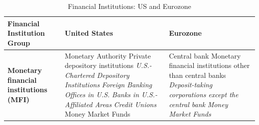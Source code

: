 \begin{table}[ht!]
\centering
\caption{Financial Institutions: US and Eurozone}
\label{tab:fi_mapping}
\small
\begin{tabular}{@{} >{\raggedright\arraybackslash}p{3.5cm} >{\raggedright\arraybackslash}p{6cm} >{\raggedright\arraybackslash}p{5.5cm} @{}}
\toprule
\textbf{Financial Institution Group} & \textbf{United States} & \textbf{Eurozone} \\
\midrule
\textbf{Monetary financial institutions (MFI)} & 
Monetary Authority \newline 
Private depository institutions \newline
\hspace*{1em} \textit{U.S.-Chartered Depository} \newline 
\hspace*{1em} \textit{Institutions} \newline 
\hspace*{1em} \textit{Foreign Banking Offices in U.S.} \newline 
\hspace*{1em} \textit{Banks in U.S.-Affiliated Areas} \newline 
\hspace*{1em} \textit{Credit Unions} \newline 
Money Market Funds & 
Central bank \newline 
Monetary financial institutions other than central banks \newline
\hspace*{1em} \textit{Deposit-taking
corporations}\newline
\hspace*{1em} \textit{except the
central bank}\newline
\hspace*{1em} \textit{Money Market Funds} \\


\end{tabular}
\end{table}
